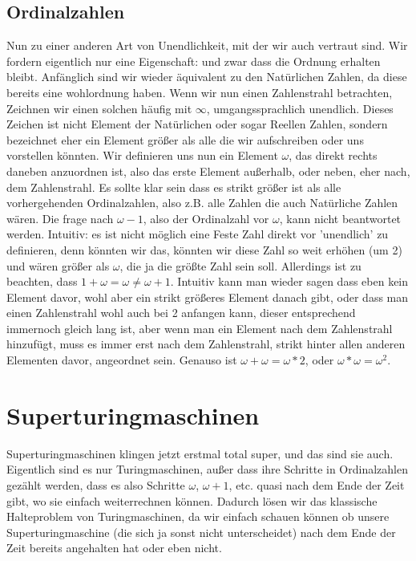 \documentclass{scrartcl}
\begin{document}
\subsection{Ordinalzahlen}
Nun zu einer anderen Art von Unendlichkeit, mit der wir auch vertraut sind.
Wir fordern eigentlich nur eine Eigenschaft: und zwar dass die Ordnung erhalten
bleibt. Anfänglich sind wir wieder äquivalent zu den Natürlichen Zahlen, da
diese bereits eine wohlordnung haben. Wenn wir nun einen Zahlenstrahl
betrachten, Zeichnen wir einen solchen häufig mit $\infty$, umgangssprachlich
unendlich. Dieses Zeichen ist nicht Element der Natürlichen oder sogar Reellen
Zahlen, sondern bezeichnet eher ein Element größer als alle die wir
aufschreiben oder uns vorstellen könnten. Wir definieren uns nun ein Element
$\omega$, das direkt rechts daneben anzuordnen ist, also das erste Element
außerhalb, oder neben, eher nach, dem Zahlenstrahl. Es sollte klar sein dass
es strikt größer ist als alle vorhergehenden Ordinalzahlen, also z.B. alle
Zahlen die auch Natürliche Zahlen wären. Die frage nach $\omega - 1$, also der
Ordinalzahl vor $\omega$, kann nicht beantwortet werden. Intuitiv: es ist nicht
möglich eine Feste Zahl direkt vor 'unendlich' zu definieren, denn könnten wir
das, könnten wir diese Zahl so weit erhöhen (um 2) und wären größer als
$\omega$, die ja die größte Zahl sein soll. Allerdings ist zu beachten, dass $1
+ \omega = \omega \neq \omega + 1$. Intuitiv kann man wieder sagen dass eben
kein Element davor, wohl aber ein strikt größeres Element danach gibt, oder
dass man einen Zahlenstrahl wohl auch bei 2 anfangen kann, dieser entsprechend
immernoch gleich lang ist, aber wenn man ein Element nach dem Zahlenstrahl
hinzufügt, muss es immer erst nach dem Zahlenstrahl, strikt hinter allen
anderen Elementen davor, angeordnet sein. Genauso ist $\omega + \omega = \omega
* 2$, oder $\omega * \omega = \omega ^ 2$.


\section{Superturingmaschinen}
Superturingmaschinen klingen jetzt erstmal total super, und das sind sie auch.
Eigentlich sind es nur Turingmaschinen, außer dass ihre Schritte in
Ordinalzahlen gezählt werden, dass es also Schritte $\omega$, $\omega + 1$,
etc. quasi nach dem Ende der Zeit gibt, wo sie einfach weiterrechnen können.
Dadurch lösen wir das klassische Halteproblem von Turingmaschinen, da wir
einfach schauen können ob unsere Superturingmaschine (die sich ja sonst nicht
unterscheidet) nach dem Ende der Zeit bereits angehalten hat oder eben nicht.
\end{document}
